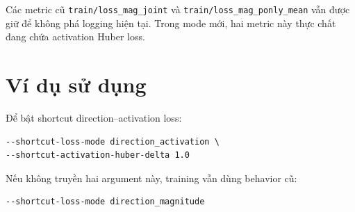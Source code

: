 \documentclass[11pt]{article}
\begin{document}
Các metric cũ \texttt{train/loss\_mag\_joint} và \texttt{train/loss\_mag\_ponly\_mean} vẫn được giữ để không phá logging hiện tại.
Trong mode mới, hai metric này thực chất đang chứa activation Huber loss.

\section{Ví dụ sử dụng}

Để bật shortcut direction--activation loss:

\begin{verbatim}
--shortcut-loss-mode direction_activation \
--shortcut-activation-huber-delta 1.0
\end{verbatim}

Nếu không truyền hai argument này, training vẫn dùng behavior cũ:

\begin{verbatim}
--shortcut-loss-mode direction_magnitude
\end{verbatim}
\end{document}
